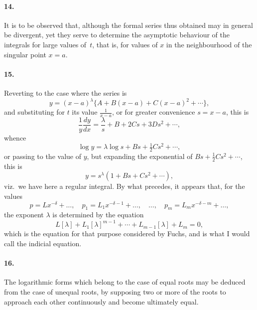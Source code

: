 \documentclass[11pt,a4paper]{book}
\begin{document}
\paragraph{14.} It is to be observed that, although the formal series thus obtained may in general be divergent, yet they serve to determine the asymptotic behaviour of the integrals for large values of~$t$, that is, for values of $x$ in the neighbourhood of the singular point $x = a$.

\paragraph{15.} Reverting to the case where the series is
\[
y = (x - a)^{\lambda}\{A + B(x - a) + C(x - a)^{2} + \cdots\},
\]
and substituting for $t$ its value $\frac{1}{x-a}$, or for greater convenience $s = x - a$, this is
\[
\frac{1}{y}\frac{dy}{dx} = \frac{\lambda}{s} + B + 2Cs + 3Ds^{2} + \cdots,
\]
whence
\[
\log y = \lambda\log s + Bs + \tfrac{1}{2}Cs^{2} + \cdots,
\]
or passing to the value of $y$, but expanding the exponential of $Bs + \tfrac{1}{2}Cs^{2} + \cdots$, this is
\[
y = s^{\lambda}(1 + Bs + Cs^{2} + \cdots),
\]
viz.\ we have here a regular integral. By what precedes, it appears that, for the values
\[
p = Lx^{-\delta} + \ldots, \quad p_{1} = L_{1}x^{-\delta-1} + \ldots, \quad \ldots, \quad p_{m} = L_{m}x^{-\delta-m} + \ldots,
\]
the exponent $\lambda$ is determined by the equation
\[
L[\lambda] + L_{1}[\lambda]^{m-1} + \cdots + L_{m-1}[\lambda] + L_{m} = 0,
\]
which is the equation for that purpose considered by Fuchs, and is what I would call the indicial equation.

\paragraph{16.} The logarithmic forms which belong to the case of equal roots may be deduced from the case of unequal roots, by supposing two or more of the roots to approach each other continuously and become ultimately equal.
\end{document}
